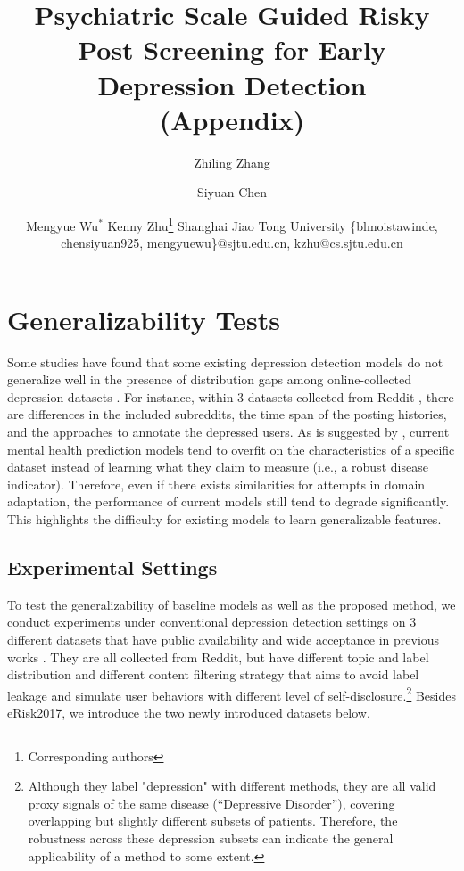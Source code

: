 \documentclass{article}
\title{Psychiatric Scale Guided Risky Post Screening for Early Depression Detection \\ (Appendix)}
\author{
Zhiling Zhang \and
Siyuan Chen \and
Mengyue Wu$^*$ \And
Kenny Zhu\thanks{Corresponding authors}
\affiliations
Shanghai Jiao Tong University
\emails
\{blmoistawinde, chensiyuan925, mengyuewu\}@sjtu.edu.cn,
kzhu@cs.sjtu.edu.cn
}
\begin{document}
\maketitle

\appendix

\section{Generalizability Tests}

Some studies have found that some existing depression detection models do not generalize well in the presence of distribution gaps among online-collected depression datasets \cite{harrigian2020models}. For instance, within 3 datasets collected from Reddit \cite{losada2016test,yates2017depression,wolohan2018detecting}, there are differences in the included subreddits, the time span of the posting histories, and the approaches to annotate the depressed users. As is suggested by \cite{ernala2019methodological}, current mental health prediction models tend to overfit on the characteristics of a specific dataset instead of learning what they claim to measure (i.e., a robust disease indicator). Therefore, even if there exists similarities for attempts in domain adaptation, the performance of current models still tend to degrade significantly. This highlights the difficulty for existing models to learn generalizable features. 

\subsection{Experimental Settings}

To test the generalizability of baseline models as well as the proposed method, we conduct experiments under conventional depression detection settings on 3 different datasets that have public availability and wide acceptance in previous works \cite{losada2017erisk,trotzek2018utilizing,harrigian2020models}. They are all collected from Reddit, but have different topic and label distribution and different content filtering strategy that aims to avoid label leakage and simulate user behaviors with different level of self-disclosure.\footnote{Although they label "depression" with different methods, they are all valid proxy signals of the same disease (``Depressive Disorder''), covering overlapping but slightly different subsets of patients. Therefore, the robustness across these depression subsets can indicate the general applicability of a method to some extent.} Besides eRisk2017, we introduce the two newly introduced datasets below. 
\end{document}
